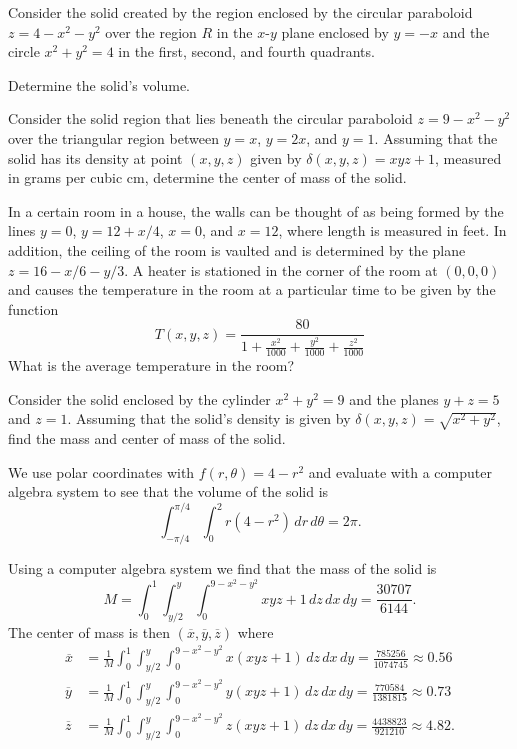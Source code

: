 \begin{exercises}
	\item Consider the solid created by the region enclosed by the circular paraboloid $z = 4 - x^2 - y^2$ over the region $R$ in the $x$-$y$ plane enclosed by $y = -x$ and the circle $x^2 + y^2 = 4$ in the first, second, and fourth quadrants. 
	
	Determine the solid's volume.

    \item Consider the solid region that lies beneath the circular paraboloid $z = 9 - x^2 - y^2$ over the triangular region between $y = x$, $y = 2x$, and $y = 1$.   Assuming that the solid has its density at point $(x,y,z)$ given by $\delta(x,y,z) = xyz + 1$, measured in grams per cubic cm, determine the center of mass of the solid.

	\item In a certain room in a house, the walls can be thought of as being formed by the lines $y = 0$, $y = 12 + x/4$, $x = 0$, and $x = 12$, where length is measured in feet.  In addition, the ceiling of the room is vaulted and is determined by the plane $z = 16 - x/6 - y/3$.  A heater is stationed in the corner of the room at $(0,0,0)$ and causes the temperature in the room at a particular time to be given by the function
$$T(x,y,z) = \frac{80}{1 + \frac{x^2}{1000} + \frac{y^2}{1000} + \frac{z^2}{1000}}$$	
What is the average temperature in the room?


	\item Consider the solid enclosed by the cylinder $x^2 + y^2 = 9$ and the planes $y + z = 5$ and $z = 1$.   Assuming that the solid's density is given by $\delta(x,y,z) = \sqrt{x^2 + y^2}$, find the mass and center of mass of the solid.

\ea

\begin{exerciseSolution}
\ba

	\item We use polar coordinates with $f(r,\theta) = 4-r^2$ and evaluate with a computer algebra system to see that the volume of the solid is 
\[\int_{-\pi/4}^{\pi/4} \int_0^2 r(4-r^2) \, dr \, d\theta = 2\pi.\]

    \item Using a computer algebra system we find that the mass of the solid is
\[M=\int_0^1 \int_{y/2}^{y} \int_0^{9-x^2-y^2} xyz+1 \, dz \, dx \, dy = \frac{30707}{6144}.\]
The center of mass is then $(\overline{x}, \overline{y}, \overline{z})$ where 
\begin{align*}
\overline{x} &= \frac{1}{M} \int_0^1 \int_{y/2}^{y} \int_0^{9-x^2-y^2} x(xyz+1) \, dz \, dx \, dy = \frac{785256}{1074745} \approx 0.56 \\
\overline{y} &= \frac{1}{M} \int_0^1 \int_{y/2}^{y} \int_0^{9-x^2-y^2} y(xyz+1) \, dz \, dx \, dy = \frac{770584}{1381815} \approx 0.73 \\
\overline{z} &= \frac{1}{M} \int_0^1 \int_{y/2}^{y} \int_0^{9-x^2-y^2} z(xyz+1) \, dz \, dx \, dy = \frac{4438823}{921210} \approx 4.82.
\end{align*}



\end{exerciseSolution}
\end{exercises}
